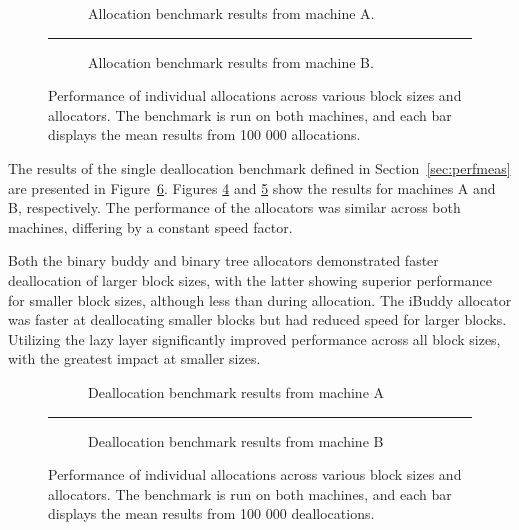 \begin{figure}[h]
  \centering
  \begin{subfigure}{\textwidth}
    \centering
    \captionsetup{justification=centering}
    
    \caption{Allocation benchmark results from machine A.}
    \label{fig:allocA}
  \end{subfigure}
  \vspace{-0.5cm}
  \rule{\textwidth}{0.1pt}
  \begin{subfigure}{\textwidth}
    \centering
    \captionsetup{justification=centering}
    
    \caption{Allocation benchmark results from machine B.}
    \label{fig:allocB}
  \end{subfigure}
  \caption{Performance of individual allocations across various block sizes and allocators. The benchmark is run on both machines, and each bar displays the mean results from 100 000 allocations.}
  \label{fig:allocbenchmark}
\end{figure}

\FloatBarrier

The results of the single deallocation benchmark defined in Section~\ref{sec:perfmeas} are presented in Figure~\ref{fig:deallocbenchmark}. Figures \ref{fig:deallocA} and \ref{fig:deallocB} show the results for machines A and B, respectively. The performance of the allocators was similar across both machines, differing by a constant speed factor.

Both the binary buddy and binary tree allocators demonstrated faster deallocation of larger block sizes, with the latter showing superior performance for smaller block sizes, although less than during allocation. The iBuddy allocator was faster at deallocating smaller blocks but had reduced speed for larger blocks. Utilizing the lazy layer significantly improved performance across all block sizes, with the greatest impact at smaller sizes.

\begin{figure}[h]
  \centering
  \begin{subfigure}{\textwidth}
    \centering
    \captionsetup{justification=centering}
    
    \caption{Deallocation benchmark results from machine A}
    \label{fig:deallocA}
  \end{subfigure}
  \rule{\textwidth}{0.1pt}
  \begin{subfigure}{\textwidth}
    \centering
    \captionsetup{justification=centering}
    
    \caption{Deallocation benchmark results from machine B}
    \label{fig:deallocB}
  \end{subfigure}
  \caption{Performance of individual allocations across various block sizes and allocators. The benchmark is run on both machines, and each bar displays the mean results from 100 000 deallocations.}
  \label{fig:deallocbenchmark}
\end{figure}

